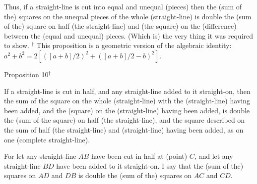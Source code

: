 Thus, if a straight-line is cut into equal and unequal (pieces) then the (sum of the) squares on the unequal pieces of the whole (straight-line) is double
the (sum of the) square on half (the straight-line) and (the square) on the (difference)
between the (equal and unequal) pieces. (Which is) the very thing it was required to show.
{\footnotesize \noindent$^\dag$ This proposition is a geometric version
of the algebraic identity: $a^2+b^2 = 2[([a+b]/2)^2 + ([a+b]/2-b)^2]$.}


\begin{center}
{\large Proposition 10$^\dag$}
\end{center}

If a straight-line is cut in half, and any straight-line added to it straight-on,
then the sum of the square on the whole (straight-line) with the (straight-line) having
been added, and the (square) on the (straight-line) having been added, 
is double the (sum of the square) on half (the straight-line), and
the square described on the sum of half (the straight-line) and (straight-line)
having been added, as on one (complete straight-line).

\epsfysize=2in
\centerline{}

For let any straight-line $AB$ have been cut in half at (point) $C$, and let any
straight-line $BD$ have been added to it straight-on. I say that the
(sum of the) squares on $AD$ and $DB$ is double the (sum of the) squares on $AC$ and $CD$.

